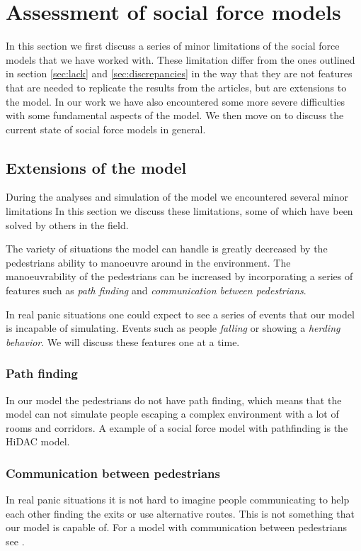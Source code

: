 \section{Assessment of social force models}
\label{sec:assessment}
In this section we first discuss a series of minor limitations of the social force models 
that we have worked with. These limitation differ from the ones outlined in 
section \ref{sec:lack} and \ref{sec:discrepancies} in the way that 
they are not features that are needed to replicate the results from the articles, 
but are extensions to the model.
In our work we have also encountered some more severe difficulties with some 
fundamental aspects of the model.
We then move on to discuss the current state of social force models in general. 

\subsection{Extensions of the model}
During the analyses and simulation of the model we encountered several minor limitations 
In this section we discuss these limitations, some of which have been solved by others in the 
field. 

The variety of situations the model can handle is greatly decreased by the 
pedestrians ability to manoeuvre around in the environment. The manoeuvrability of 
the pedestrians can be increased by incorporating a series of features such as 
\emph{path finding} and \emph{communication between pedestrians}. 

In real panic situations one could expect to see a series of events that our 
model is incapable of simulating. Events such as people \emph{falling} or showing a 
\emph{herding behavior}. We will discuss these features one at a time.

\subsubsection{Path finding}
In our model the pedestrians do not have path finding, which means that the model 
can not simulate people escaping a complex environment with a lot of rooms 
and corridors. A example of a social force model with pathfinding is the HiDAC 
model\cite{HiDAC}.

\subsubsection{Communication between pedestrians}
In real panic situations it is not hard to imagine people communicating to help each other finding the exits or use alternative routes. This is 
not something that our model is capable of. For a model with communication between 
pedestrians see \cite{HiDAC}.


